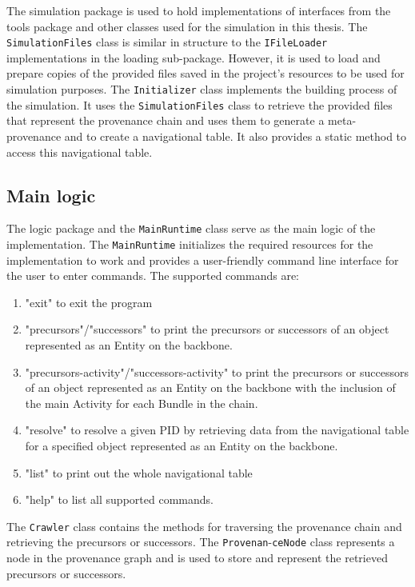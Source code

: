\documentclass[
  digital,     %
  oneside,     %
  nosansbold,  %
  nocolorbold, %
  lof,         %
  lot,         %
]{fithesis4}
\begin{document}
The simulation package is used to hold implementations of interfaces from the tools package and other classes used for the simulation in this thesis. The \texttt{SimulationFiles} class is similar in structure to the \texttt{IFileLoader} implementations in the loading sub-package. However, it is used to load and prepare copies of the provided files saved in the project's resources to be used for simulation purposes. The \texttt{Initializer} class implements the building process of the simulation. It uses the \texttt{SimulationFiles} class to retrieve the provided files that represent the provenance chain and uses them to generate a meta-provenance and to create a navigational table. It also provides a static method to access this navigational table.

\newpage
\subsection{Main logic}
\vskip 0.35cm

The logic package and the \texttt{MainRuntime} class serve as the main logic of the implementation. The \texttt{MainRuntime} initializes the required resources for the implementation to work and provides a user-friendly command line interface for the user to enter commands. The supported commands are:

\begin{enumerate}
    \item "exit" to exit the program
    \item "precursors"/"successors" to print the precursors or successors of an object represented as an Entity on the backbone.
    \item "precursors-activity"/"successors-activity" to print the precursors or successors of an object represented as an Entity on the backbone with the inclusion of the main Activity for each Bundle in the chain.
    \item "resolve" to resolve a given PID by retrieving data from the navigational table for a specified object represented as an Entity on the backbone.
    \item "list" to print out the whole navigational table
    \item "help" to list all supported commands.
\end{enumerate}

The \texttt{Crawler} class contains the methods for traversing the provenance chain and retrieving the precursors or successors. The \texttt{Provenan}-\texttt{ceNode} class represents a node in the provenance graph and is used to store and represent the retrieved precursors or successors.
\end{document}
